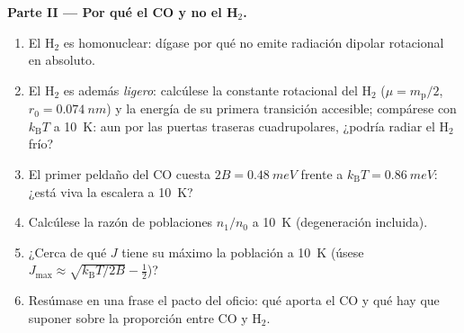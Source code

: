 \begin{problem}
\medskip\noindent\textbf{Parte II --- Por qué el CO y no el H$_2$.}
\begin{enumerate}[resume]
  \item El H$_2$ es homonuclear: dígase por qué no emite radiación dipolar
        rotacional en absoluto.
  \item El H$_2$ es además \emph{ligero}: calcúlese la constante rotacional
        del H$_2$ ($\mu = m_{\text{p}}/2$, $r_0 = \qty{0.074}{nm}$)
        y la energía de su primera transición accesible; compárese con
        $k_{\text{B}}T$ a \qty{10}{K}: aun por las puertas traseras
        cuadrupolares, ¿podría radiar el H$_2$ frío?
  \item El primer peldaño del CO cuesta $2B = \qty{0.48}{meV}$ frente a
        $k_{\text{B}}T = \qty{0.86}{meV}$: ¿está viva la escalera a
        \qty{10}{K}?
  \item Calcúlese la razón de poblaciones $n_1/n_0$ a \qty{10}{K}
        (degeneración incluida).
  \item ¿Cerca de qué $J$ tiene su máximo la población a \qty{10}{K}
        (úsese $J_{\max} \approx \sqrt{k_{\text{B}}T/2B} - \tfrac12$)?
  \item Resúmase en una frase el pacto del oficio: qué aporta el CO y qué
        hay que suponer sobre la proporción entre CO y H$_2$.
\end{enumerate}


\end{problem}
